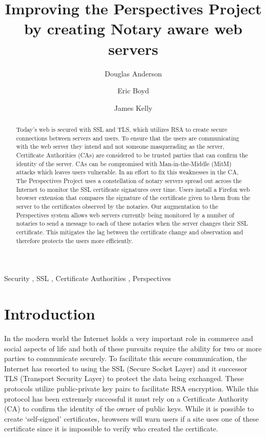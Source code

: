 \documentclass[preprint,review,12pt]{elsarticle}
\begin{document}
\begin{frontmatter}

\title{Improving the Perspectives Project by creating Notary aware web servers}

\author[doug]{Douglas Anderson}
\author[eric]{Eric Boyd}
\author[james]{James Kelly}
\address[doug]{dander01@uoguelph.ca}
\address[eric]{boyde@uoguelph.ca}
\address[james]{kellyj@uoguelph.ca}


\begin{abstract}

Today's web is secured with SSL and TLS, which utilizes RSA to create secure
connections between servers and users. To ensure that the users are
communicating with the web server they intend and not someone masquerading as
the server, Certificate Authorities (CAs) are considered to be trusted
parties that can confirm the identity of the server. CAs can be compromised
with Man-in-the-Middle (MitM) attacks which leaves users vulnerable. In an
effort to fix this weaknesses in the CA, The Perspectives Project uses a
constellation of notary servers spread out across the Internet to monitor the
SSL certificate signatures over time. Users install a Firefox web browser
extension that compares the signature of the certificate given to them from the
server to the certificates observed by the notaries. Our augmentation to the
Perspectives system allows web servers currently being monitored by a number of
notaries to send a message to each of these notaries when the server changes
their SSL certificate. This mitigates the lag between the certificate change
and observation and therefore protects the users more efficiently.

\end{abstract}

\begin{keyword}
Security \sep
SSL \sep
Certificate Authorities \sep
Perspectives
\end{keyword}

\end{frontmatter}

\section{Introduction}
\label{intro}

In the modern world the Internet holds a very important role in commerce and
social aspects of life and both of these pursuits require the ability for two
or more parties to communicate securely. To facilitate this secure
communication, the Internet has resorted to using the SSL (Secure Socket Layer)
and it successor TLS (Transport Security Layer) to protect the data being
exchanged.  These protocols utilize public-private key pairs to facilitate RSA
encryption.  While this protocol has been extremely successful it must rely on
a Certificate Authority (CA) to confirm the identity of the owner of public
keys. While it is possible to create `self-signed' certificates, browsers will
warn users if a site uses one of these certificate since it is impossible to
verify who created the certificate.
\end{document}
